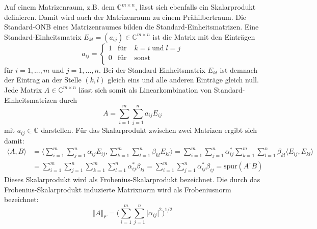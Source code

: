 \documentclass[9pt]{report}
\begin{document}
Auf einem Matrizenraum, z.B. dem $\mathbb{C}^{m\times n}$, lässt sich ebenfalls ein Skalarprodukt definieren. Damit wird auch der Matrizenraum zu einem Prähilbertraum. Die Standard-ONB eines Matrizenraumes bilden die Standard-Einheitsmatrizen. Eine Standard-Einheitsmatrix $E_{kl}=(a_{ij})\in\mathbb{C}^{m\times n}$ ist die Matrix mit den Einträgen
\begin{equation}
a_{ij}=\left\{\begin{array}{ccc} 1 & \textrm{für} & \; k=i\;\mathrm{und}\;l=j\\
0 & \textrm{für} & \;\mathrm{sonst}\\ \end{array}\right.
\end{equation}
für $i=1,...,m$ und $j=1,...,n$. Bei der Standard-Einheitsmatrix $E_{kl}$ ist demnach der Eintrag an der Stelle $(k,l)$ gleich eins und alle anderen Einträge gleich null. Jede Matrix $A\in \mathbb{C}^{m\times n}$ lässt sich somit als Linearkombination von Standard-Einheitsmatrizen durch
\begin{equation}
A=\sum_{i=1}^{m}\sum_{j=1}^{n}a_{ij}E_{ij}
\end{equation}
mit $a_{ij}\in\mathbb{C}$ darstellen. Für das Skalarprodukt zwischen zwei Matrizen ergibt sich damit:
\begin{align}
\langle A,B\rangle &=\Bigg\langle\sum_{i=1}^{m}\sum_{j=1}^{n}\alpha_{ij}E_{ij},\sum_{k=1}^{m}\sum_{l=1}^{n}\beta_{kl}E_{kl}\Bigg\rangle =\sum_{i=1}^{m}\sum_{j=1}^{n}\alpha_{ij}^{*}\sum_{k=1}^{m}\sum_{l=1}^{n}\beta_{kl}\langle E_{ij},E_{kl}\rangle\\
&=\sum_{i=1}^{m}\sum_{j=1}^{n}\sum_{k=1}^{m}\sum_{l=1}^{n}\alpha_{ij}^{*}\beta_{kl} =\sum_{i=1}^{m}\sum_{j=1}^{n}\alpha_{ij}^{*}\beta_{ij}=\mathrm{spur}(A^{\dagger}B)
\end{align}
Dieses Skalarprodukt wird als Frobenius-Skalarprodukt bezeichnet. Die durch das Frobenius-Skalarprodukt induzierte Matrixnorm wird als Frobeniusnorm bezeichnet:
\begin{equation}
\Vert A\Vert_{F}=\Bigg(\sum_{i=1}^{m}\sum_{j=1}^{n}\vert \alpha_{ij}\vert^{2}\Bigg)^{1/2}
\end{equation}
\end{document}
